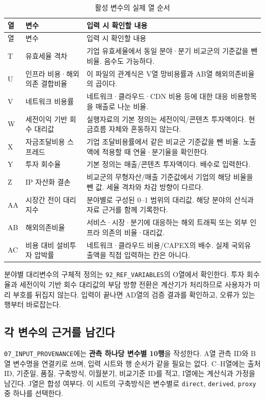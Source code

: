 \begin{longtable}{@{}L{0.8cm}L{4.8cm}L{9.1cm}@{}}
\caption{활성 변수의 실제 열 순서}\label{tab:simulator-features}\\
\toprule
{}
열 & 변수 & 입력 시 확인할 내용 \\
\midrule
\endfirsthead
\toprule
{}
열 & 변수 & 입력 시 확인할 내용 \\
\midrule
\endhead
\bottomrule
\endfoot
T & 유효세율 격차 & 기업 유효세율에서 동일 분야·분기 비교군의 기준값을 뺀 비율. 음수도 가능하다. \\
U & 인프라 비용·해외의존 결합비율 & 이 파일의 관계식은 V열 망비용률과 AB열 해외의존비율의 곱이다. \\
V & 네트워크 비용률 & 네트워크·클라우드·CDN 비용 등에 대한 대응 비용항목을 매출로 나눈 비율. \\
W & 세전이익 기반 회수 대리값 & 실행자료의 기본 정의는 세전이익/콘텐츠 투자액이다. 현금흐름 자체와 혼동하지 않는다. \\
X & 자금조달비용 스프레드 & 기업 조달비용률에서 같은 비교군 기준값을 뺀 비율. 노출액에 적용할 때 연율·분기율을 확인한다. \\
Y & 투자 회수율 & 기본 정의는 매출/콘텐츠 투자액이다. 배수로 입력한다. \\
Z & IP 자산화 결손 & 비교군의 무형자산/매출 기준값에서 기업의 해당 비율을 뺀 값. 세율 격차와 차감 방향이 다르다. \\
AA & 시장간 전이 대리지수 & 분야별로 구성된 0--1 범위의 대리값. 해당 분야의 산식과 자료 근거를 함께 기록한다. \\
AB & 해외의존비율 & 서비스·시장·분기에 대응하는 해외 트래픽 또는 외부 인프라 의존의 비율·대리값. \\
AC & 비용 대비 설비투자 압박률 & 네트워크·클라우드 비용/CAPEX의 배수. 실제 국외유출액을 직접 입력하는 칸은 아니다. \\
\end{longtable}

분야별 대리변수의 구체적 정의는 \nolinkurl{92_REF_VARIABLES}의 O열에서 확인한다. 투자 회수율과 세전이익 기반 회수 대리값의 부담 방향 전환은 계산기가 처리하므로 사용자가 미리 부호를 뒤집지 않는다. 입력이 끝나면 AD열의 검증 결과를 확인하고, 오류가 있는 행부터 바로잡는다.

\subsection{각 변수의 근거를 남긴다}

\nolinkurl{07_INPUT_PROVENANCE}에는 \textbf{관측 하나당 변수별 10행}을 작성한다. A열 관측 ID와 B열 변수명을 연결키로 쓰며, 입력 시트와 행 순서가 같을 필요는 없다. C--H열에는 출처 ID, 기준일, 품질, 구축방식, 이월분기, 비교기준 ID를 적고, I열에는 계산식과 가정을 남긴다. J열은 합성 여부다. 이 시트의 구축방식은 변수별로 \texttt{direct}, \texttt{derived}, \texttt{proxy} 중 하나를 선택한다.

